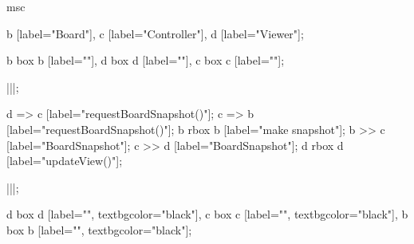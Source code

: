 \begin{msc}
msc {

b [label="Board"],
c [label="Controller"],
d [label="Viewer"];

b box b [label=""],
d box d [label=""],
c box c [label=""];

|||;

d => c [label="requestBoardSnapshot()"];
c => b [label="requestBoardSnapshot()"];
b rbox b [label="make snapshot"];
b >> c [label="BoardSnapshot"];
c >> d [label="BoardSnapshot"];
d rbox d [label="updateView()"];

|||;

d box d [label="", textbgcolor="black"],
c box c [label="", textbgcolor="black"],
b box b [label="", textbgcolor="black"];

}
\end{msc}
